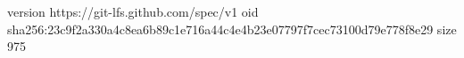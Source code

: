 version https://git-lfs.github.com/spec/v1
oid sha256:23c9f2a330a4c8ea6b89c1e716a44c4e4b23e07797f7cec73100d79e778f8e29
size 975

